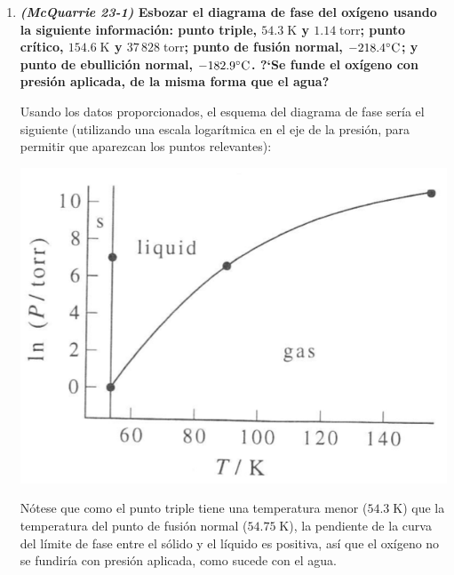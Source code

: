 \documentclass[a4paper,12pt]{article}
\begin{document}
\begin{enumerate}
N\'otese en la figura que se observan 2 puntos triples. En uno pueden coexistir el grafito, el l\'iquido y el vapor, mientras que en el otro pueden coexistir el diamante, el grafito y el l\'iquido. Considerando la relaci\'on inversa entre presi\'on y volumen de una sustancia (al aumental la presi\'on, el vol\'umen tiende a disminuir), se observa que el diamante es m\'as estable a presiones m\'as altas que el grafito, por lo que tendr\'ia menor volumen, as\'i que su densidad es mayor. Esta misma idea se podr\'ia usar para fabricar diamante a partir del grafito: aumentando la presi\'on a temperatura constante.

 \item \textbf{\textit{(McQuarrie 23-1)} Esbozar el diagrama de fase del ox\'igeno usando la siguiente informaci\'on: punto triple, $54.3\;\mbox{K}$ y $1.14\;\mbox{torr}$; punto cr\'itico, $154.6\;\mbox{K}$ y $37\,828\;\mbox{torr}$; punto de fusi\'on normal, $-218.4\celsius$; y punto de ebullici\'on normal, $-182.9\celsius$. ?`Se funde el ox\'igeno con presi\'on aplicada, de la misma forma que el agua?} %

Usando los datos proporcionados, el esquema del diagrama de fase ser\'ia el siguiente (utilizando una escala logar\'itmica en el eje de la presi\'on, para permitir que aparezcan los puntos relevantes):

\begin{center}
 \includegraphics[scale=0.55]{figure6.png}
\end{center}

N\'otese que como el punto triple tiene una temperatura menor ($54.3\;\mbox{K}$) que la temperatura del punto de fusi\'on normal ($54.75\;\mbox{K}$), la pendiente de la curva del l\'imite de fase entre el s\'olido y el l\'iquido es positiva, as\'i que el ox\'igeno no se fundir\'ia con presi\'on aplicada, como sucede con el agua.


\end{enumerate}
\end{document}
